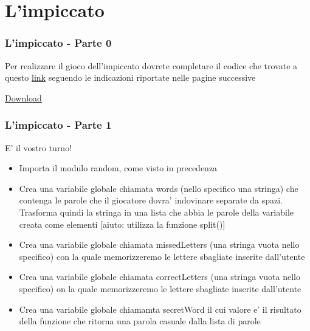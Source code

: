 
\section{L'impiccato}

\begin{frame}
\frametitle{L'impiccato - Parte 0}
    Per realizzare il gioco dell'impiccato dovrete completare il codice che trovate a questo
\href{https://raw.githubusercontent.com/ragazzedigitalicesena/slide-2019/master/tex/chapter_5-8/hangman.py}{link} seguendo le indicazioni riportate nelle pagine successive

\vspace{5mm}
\href{https://raw.githubusercontent.com/ragazzedigitalicesena/slide-2019/master/tex/chapter_5-8/hangman.py}{Download}
\end{frame}

\begin{frame}[fragile]
\frametitle{L'impiccato - Parte 1}

\begin{block}{E' il vostro turno!}
    
    \begin{itemize}
        \item Importa il modulo random, come visto in precedenza
        \item Crea una variabile globale chiamata words (nello specifico una stringa) che contenga le parole che il giocatore dovra' indovinare separate da spazi. Trasforma quindi la stringa in una lista che abbia le parole della variabile creata come elementi [aiuto: utilizza la funzione split()]
        \item Crea una variabile globale chiamata missedLetters (una stringa vuota nello specifico) con la quale memorizzeremo le lettere sbagliate inserite dall'utente
        \item Crea una variabile globale chiamata correctLetters (una stringa vuota nello specifico) on la quale memorizzeremo le lettere sbagliate inserite dall'utente
        \item Crea una variabile globale chiamamta secretWord il cui valore e' il risultato della funzione che ritorna una parola casuale dalla lista di parole
    \end{itemize}
\end{block}
\end{frame}

